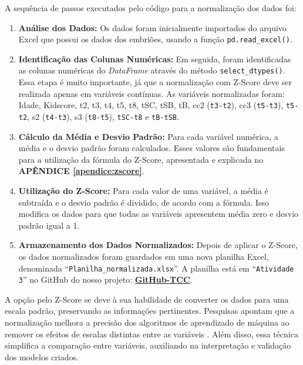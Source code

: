 A sequência de passos executados pelo código para a normalização dos dados foi:

\begin{enumerate}
    \item \textbf{Análise dos Dados:} Os dados foram inicialmente importados do arquivo Excel que possui os dados dos embriões, usando a função \texttt{pd.read\_excel()}.
    
    \item \textbf{Identificação das Colunas Numéricas:} Em seguida, foram identificadas as colunas numéricas do \textit{DataFrame} através do método \texttt{select\_dtypes()}. Essa etapa é muito importante, já que a normalização com Z-Score deve ser realizada apenas em variáveis contínuas. As variáveis normalizadas foram: Idade, Kidscore, t2, t3, t4, t5, t8, tSC, tSB, tB, cc2 (\texttt{t3-t2}), cc3 (\texttt{t5-t3}), \texttt{t5-t2}, s2 (\texttt{t4-t3}), s3 (\texttt{t8-t5}), \texttt{tSC-t8} e \texttt{tB-tSB}.
    
    \item \textbf{Cálculo da Média e Desvio Padrão:} Para cada variável numérica, a média e o desvio padrão foram calculados. Esses valores são fundamentais para a utilização da fórmula do Z-Score, apresentada e explicada no \textbf{APÊNDICE \ref{apendice:zscore}}.
    
    \item \textbf{Utilização do Z-Score:} Para cada valor de uma variável, a média é subtraída e o desvio padrão é dividido, de acordo com a fórmula. Isso modifica os dados para que todas as variáveis apresentem média zero e desvio padrão igual a 1.
    
    \item \textbf{Armazenamento dos Dados Normalizados:} Depois de aplicar o Z-Score, os dados normalizados foram guardados em uma nova planilha Excel, denominada “\texttt{Planilha\_normalizada.xlsx}”. A planilha está em “\texttt{Atividade 3}” no GitHub do nosso projeto: \textbf{\href{https://github.com/sabrinaberno/TCC1}{GitHub-TCC}}.
\end{enumerate}

A opção pelo Z-Score se deve à sua habilidade de converter os dados para uma escala padrão, preservando as informações pertinentes. Pesquisas apontam que a normalização melhora a precisão dos algoritmos de aprendizado de máquina ao remover os efeitos de escalas distintas entre as variáveis \cite{jaiswal2024}. Além disso, essa técnica simplifica a comparação entre variáveis, auxiliando na interpretação e validação dos modelos criados.

